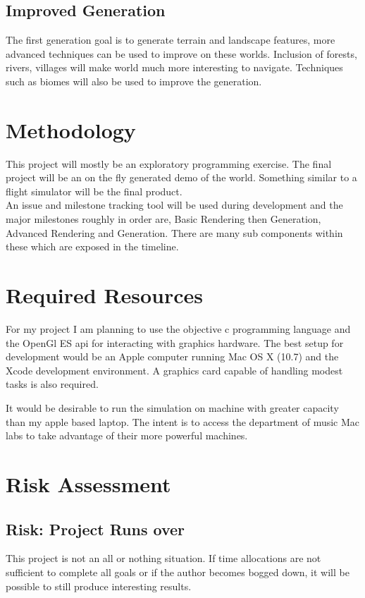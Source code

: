 \documentclass[a4paper,12pt,notitlepage]{article}
\begin{document}
\subsection*{Improved Generation}
The first generation goal is to generate terrain and landscape features, more 
advanced techniques can be used to improve on these worlds. Inclusion of forests,
rivers, villages will make world much more interesting to navigate. Techniques 
such as biomes will also be used to improve the generation.

\section{Methodology}
This project will mostly be an exploratory programming exercise. The final 
project will be an on the fly generated demo of the world. Something similar to
a flight simulator will be the final product.\\

An issue and milestone tracking tool will be used during development and the major
milestones roughly in order are, Basic Rendering then Generation, Advanced 
Rendering and Generation. There are many sub components within these which are
exposed in the timeline.

\section{Required Resources}
For my project I am planning to use the objective c programming language and the
OpenGl ES api for interacting with graphics hardware. The best setup for 
development would be an Apple computer running Mac OS X (10.7) and the Xcode 
development environment. A graphics card capable of handling modest tasks is also
required. 

It would be desirable to run the simulation on machine with greater capacity than
my apple based laptop. The intent is to access the department of music Mac labs
to take advantage of their more powerful machines.

\section{Risk Assessment}
\subsection*{Risk: Project Runs over}
This project is not an all or nothing situation. If time allocations are not
sufficient to complete all goals or if the author becomes bogged down, it will
be possible to still produce interesting results.\\
\end{document}
